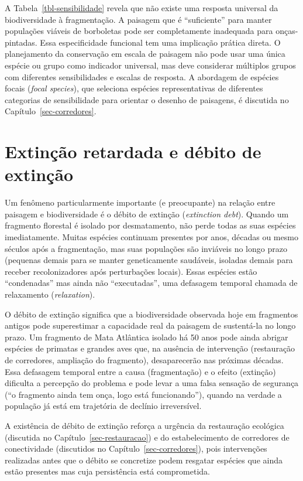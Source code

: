 \documentclass[
  portuguese,
  11pt,
  a4paper,
  open=any]{scrbook}
\begin{document}
A Tabela~\ref{tbl-sensibilidade} revela que não existe uma resposta
universal da biodiversidade à fragmentação. A paisagem que é
``suficiente'' para manter populações viáveis de borboletas pode ser
completamente inadequada para onças-pintadas. Essa especificidade
funcional tem uma implicação prática direta. O planejamento da
conservação em escala de paisagem não pode usar uma única espécie ou
grupo como indicador universal, mas deve considerar múltiplos grupos com
diferentes sensibilidades e escalas de resposta. A abordagem de espécies
focais (\emph{focal species}), que seleciona espécies representativas de
diferentes categorias de sensibilidade para orientar o desenho de
paisagens, é discutida no Capítulo~\ref{sec-corredores}.

\section{Extinção retardada e débito de
extinção}\label{extinuxe7uxe3o-retardada-e-duxe9bito-de-extinuxe7uxe3o}

Um fenômeno particularmente importante (e preocupante) na relação entre
paisagem e biodiversidade é o débito de extinção (\emph{extinction
debt}). Quando um fragmento florestal é isolado por desmatamento, não
perde todas as suas espécies imediatamente. Muitas espécies continuam
presentes por anos, décadas ou mesmo séculos após a fragmentação, mas
suas populações são inviáveis no longo prazo (pequenas demais para se
manter geneticamente saudáveis, isoladas demais para receber
recolonizadores após perturbações locais). Essas espécies estão
``condenadas'' mas ainda não ``executadas'', uma defasagem temporal
chamada de relaxamento (\emph{relaxation}).

O débito de extinção significa que a biodiversidade observada hoje em
fragmentos antigos pode superestimar a capacidade real da paisagem de
sustentá-la no longo prazo. Um fragmento de Mata Atlântica isolado há 50
anos pode ainda abrigar espécies de primatas e grandes aves que, na
ausência de intervenção (restauração de corredores, ampliação do
fragmento), desaparecerão nas próximas décadas. Essa defasagem temporal
entre a causa (fragmentação) e o efeito (extinção) dificulta a percepção
do problema e pode levar a uma falsa sensação de segurança (``o
fragmento ainda tem onça, logo está funcionando''), quando na verdade a
população já está em trajetória de declínio irreversível.

A existência de débito de extinção reforça a urgência da restauração
ecológica (discutida no Capítulo~\ref{sec-restauracao}) e do
estabelecimento de corredores de conectividade (discutidos no
Capítulo~\ref{sec-corredores}), pois intervenções realizadas antes que o
débito se concretize podem resgatar espécies que ainda estão presentes
mas cuja persistência está comprometida.
\end{document}
